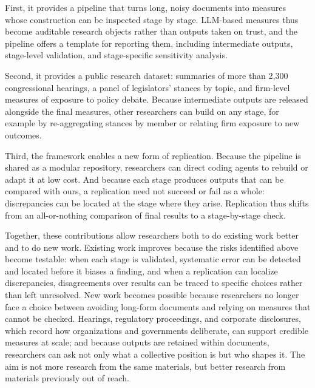 \documentclass[11pt]{article}
\begin{document}
First, it provides a pipeline that turns long, noisy documents into measures whose construction can be inspected stage by stage. LLM-based measures thus become auditable research objects rather than outputs taken on trust, and the pipeline offers a template for reporting them, including intermediate outputs, stage-level validation, and stage-specific sensitivity analysis.

Second, it provides a public research dataset: summaries of more than 2,300 congressional hearings, a panel of legislators' stances by topic, and firm-level measures of exposure to policy debate. Because intermediate outputs are released alongside the final measures, other researchers can build on any stage, for example by re-aggregating stances by member or relating firm exposure to new outcomes.

Third, the framework enables a new form of replication. Because the pipeline is shared as a modular repository, researchers can direct coding agents to rebuild or adapt it at low cost. And because each stage produces outputs that can be compared with ours, a replication need not succeed or fail as a whole: discrepancies can be located at the stage where they arise. Replication thus shifts from an all-or-nothing comparison of final results to a stage-by-stage check.

Together, these contributions allow researchers both to do existing work better and to do new work. Existing work improves because the risks identified above become testable: when each stage is validated, systematic error can be detected and located before it biases a finding, and when a replication can localize discrepancies, disagreements over results can be traced to specific choices rather than left unresolved. New work becomes possible because researchers no longer face a choice between avoiding long-form documents and relying on measures that cannot be checked. Hearings, regulatory proceedings, and corporate disclosures, which record how organizations and governments deliberate, can support credible measures at scale; and because outputs are retained within documents, researchers can ask not only what a collective position is but who shapes it. The aim is not more research from the same materials, but better research from materials previously out of reach.

\vspace{2em}
\end{document}

